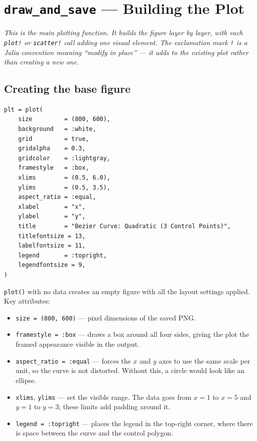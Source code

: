 \documentclass[12pt, a4paper]{article}
\newcommand{\cd}[1]{\texttt{#1}}
\begin{document}
\section{\texttt{draw\_and\_save} --- Building the Plot}

\textit{This is the main plotting function.
It builds the figure layer by layer, with each
\cd{plot!} or \cd{scatter!} call adding one visual element.
The exclamation mark \cd{!} is a Julia convention meaning
``modify in place'' --- it adds to the existing plot
rather than creating a new one.}

\subsection{Creating the base figure}

\begin{verbatim}
plt = plot(
    size         = (800, 600),
    background   = :white,
    grid         = true,
    gridalpha    = 0.3,
    gridcolor    = :lightgray,
    framestyle   = :box,
    xlims        = (0.5, 6.0),
    ylims        = (0.5, 3.5),
    aspect_ratio = :equal,
    xlabel       = "x",
    ylabel       = "y",
    title        = "Bezier Curve: Quadratic (3 Control Points)",
    titlefontsize = 13,
    labelfontsize = 11,
    legend       = :topright,
    legendfontsize = 9,
)
\end{verbatim}

\cd{plot()} with no data creates an empty figure with
all the layout settings applied.
Key attributes:

\begin{itemize}
  \item \cd{size = (800, 600)} --- pixel dimensions of the saved PNG.
  \item \cd{framestyle = :box} --- draws a box around all four sides,
        giving the plot the framed appearance visible in the output.
  \item \cd{aspect\_ratio = :equal} --- forces the $x$ and $y$ axes
        to use the same scale per unit, so the curve is not distorted.
        Without this, a circle would look like an ellipse.
  \item \cd{xlims}, \cd{ylims} --- set the visible range.
        The data goes from $x=1$ to $x=5$ and $y=1$ to $y=3$;
        these limits add padding around it.
  \item \cd{legend = :topright} --- places the legend in the
        top-right corner, where there is space between the
        curve and the control polygon.
\end{itemize}
\end{document}

